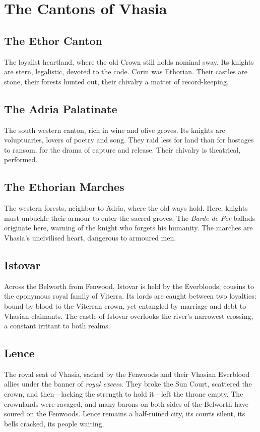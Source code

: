 \documentclass[11pt,twoside]{book}
\begin{document}
\chapter{The Cantons of Vhasia}\label{ch:cantons}

\section{The Ethor Canton}
The loyalist heartland, where the old Crown still holds nominal sway. Its knights are stern, legalistic, devoted to the code. Corin was Ethorian. Their castles are stone, their forests hunted out, their chivalry a matter of record-keeping.

\section{The Adria Palatinate}
The south western canton, rich in wine and olive groves. Its knights are voluptuaries, lovers of poetry and song. They raid less for land than for hostages to ransom, for the drama of capture and release. Their chivalry is theatrical, performed.

\section{The Ethorian Marches}
The western forests, neighbor to Adria, where the old ways hold. Here, knights must unbuckle their armour to enter the sacred groves. The \emph{Barde de Fer} ballads originate here, warning of the knight who forgets his humanity. The marches are Vhasia's uncivilised heart, dangerous to armoured men.

\section{Istovar}
Across the Belworth from Fenwood, Istovar is held by the Everbloods, cousins to the eponymous royal family of Viterra. Its lords are caught between two loyalties: bound by blood to the Viterran crown, yet entangled by marriage and debt to Vhasian claimants. The castle of Istovar overlooks the river's narrowest crossing, a constant irritant to both realms.

\section{Lence}
The royal seat of Vhasia, sacked by the Fenwoods and their Vhasian Everblood allies under the banner of \textit{royal excess}. They broke the Sun Court, scattered the crown, and then---lacking the strength to hold it---left the throne empty. The crownlands were ravaged, and many barons on both sides of the Belworth have soured on the Fenwoods. Lence remains a half-ruined city, its courts silent, its bells cracked, its people waiting.
\end{document}
